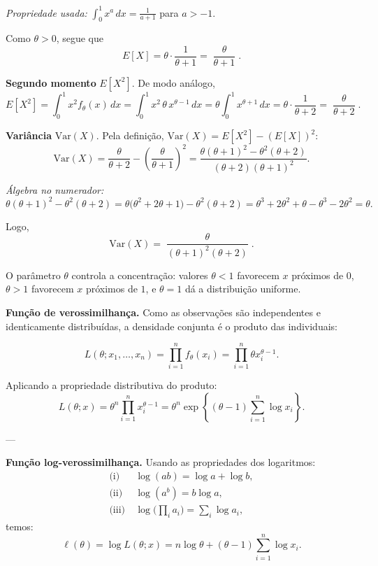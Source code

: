 \emph{Propriedade usada:} $\displaystyle \int_0^1 x^{a}\,dx=\frac{1}{a+1}$ para $a>-1$.

Como $\theta>0$, segue que
\[
E[X]=\theta\cdot\frac{1}{\theta+1}
=\boxed{\;\frac{\theta}{\theta+1}\;}.
\]

\textbf{Segundo momento} $E[X^2]$.
De modo análogo,
\[
E[X^2]=\int_0^1 x^2 f_\theta(x)\,dx
=\int_0^1 x^2\,\theta\,x^{\theta-1}\,dx
=\theta\int_0^1 x^{\theta+1}\,dx
=\theta\cdot\frac{1}{\theta+2}
=\boxed{\;\frac{\theta}{\theta+2}\;}.
\]

\textbf{Variância} $\mathrm{Var}(X)$.
Pela definição, $\mathrm{Var}(X)=E[X^2]-(E[X])^2$:
\[
\mathrm{Var}(X)
=\frac{\theta}{\theta+2}-\left(\frac{\theta}{\theta+1}\right)^2
=\frac{\theta(\theta+1)^2-\theta^2(\theta+2)}{(\theta+2)(\theta+1)^2}.
\]

\emph{Álgebra no numerador:}
\[
\theta(\theta+1)^2-\theta^2(\theta+2)
=\theta\big(\theta^2+2\theta+1\big)-\theta^2(\theta+2)
= \theta^3+2\theta^2+\theta - \theta^3 - 2\theta^2
= \theta.
\]

Logo,
\[
\mathrm{Var}(X)
=\boxed{\;\frac{\theta}{(\theta+1)^2(\theta+2)}\;}.
\]


O parâmetro $\theta$ controla a concentração:
valores $\theta<1$ favorecem $x$ próximos de $0$,
$\theta>1$ favorecem $x$ próximos de $1$,
e $\theta=1$ dá a distribuição uniforme.


\textbf{Função de verossimilhança.}
Como as observações são independentes e identicamente distribuídas, 
a densidade conjunta é o produto das individuais:

\[
L(\theta; x_1,\ldots,x_n)
= \prod_{i=1}^n f_\theta(x_i)
= \prod_{i=1}^n \theta x_i^{\theta-1}.
\]

Aplicando a propriedade distributiva do produto:
\[
L(\theta;x) 
= \theta^n \prod_{i=1}^n x_i^{\theta-1}
= \theta^n \exp\!\left\{(\theta-1)\sum_{i=1}^n \log x_i\right\}.
\]

---

\textbf{Função log-verossimilhança.}
Usando as propriedades dos logaritmos:
\begin{align*}
\text{(i)}&\ \log(ab)=\log a+\log b, \\
\text{(ii)}&\ \log(a^b)=b\log a, \\
\text{(iii)}&\ \log\Big(\prod_i a_i\Big)=\sum_i \log a_i,
\end{align*}
temos:
\[
\ell(\theta) = \log L(\theta;x)
= n\log\theta + (\theta - 1)\sum_{i=1}^n \log x_i.
\]

